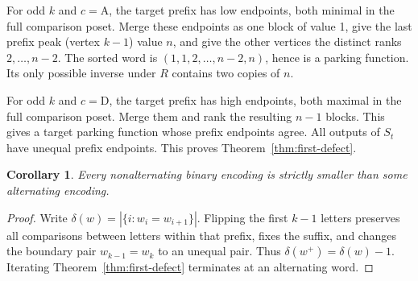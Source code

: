 \documentclass[11pt]{article}
\newtheorem{corollary}[theorem]{Corollary}
\theoremstyle{definition}
\newcommand{\A}{\mathrm A}
\newcommand{\D}{\mathrm D}
\begin{document}
For odd $k$ and $c=\A$, the target prefix has low endpoints,
both minimal in the full comparison poset. Merge these endpoints
as one block of value 1, give the last prefix peak (vertex $k-1$)
value $n$, and give the other vertices the distinct ranks
$2,\ldots,n-2$. The sorted word is
$(1,1,2,\ldots,n-2,n)$, hence is a parking function.
Its only possible inverse under $R$ contains two copies of $n$.

For odd $k$ and $c=\D$, the target prefix has high endpoints,
both maximal in the full comparison poset. Merge them and rank
the resulting $n-1$ blocks. This gives a target parking function
whose prefix endpoints agree. All outputs of $S_t$ have unequal
prefix endpoints. This proves Theorem~\ref{thm:first-defect}.

\begin{corollary}\label{cor:binary}
Every nonalternating binary encoding is strictly smaller than some
alternating encoding.
\end{corollary}
\begin{proof}
Write $\delta(w)=|\{i:w_i=w_{i+1}\}|$. Flipping the first $k-1$
letters preserves all comparisons between letters within that
prefix, fixes the suffix, and changes the boundary pair
$w_{k-1}=w_k$ to an unequal pair. Thus
$\delta(w^+)=\delta(w)-1$. Iterating
Theorem~\ref{thm:first-defect} terminates at an alternating word.
\end{proof}
\end{document}
